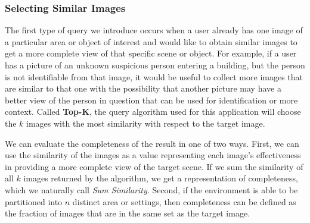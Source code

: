 
\subsubsection{Selecting Similar Images}

The first type of query we introduce occurs when a user already has one image of a particular area or object of interest and would like to obtain similar images to get a more complete view of that specific scene or object.  For example, if a user has a picture of an unknown suspicious person entering a building, but the person is not identifiable from that image, it would be useful to collect more images that are similar to that one with the possibility that another picture may have a better view of the person in question that can be used for identification or more context.  Called {\bf Top-K}, the query algorithm used for this application will choose the $k$ images with the most similarity with respect to the target image.  

We can evaluate the completeness of the result in one of two ways.  First, we can use the similarity of the images as a value representing each image's effectiveness in providing a more complete view of the target scene.  If we sum the similarity of all $k$ images returned by the algorithm, we get a representation of completeness, which we naturally call \emph{Sum Similarity}.  %
Second, if the environment is able to be partitioned into $n$ distinct area or settings, then completeness can be defined as the fraction of images that are in the same set as the target image.


